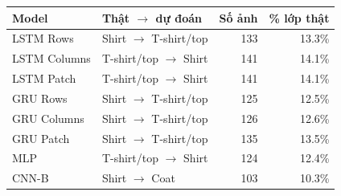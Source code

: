 \begin{tabular}{llrr}
\toprule
Model & Thật $\to$ dự đoán & Số ảnh & \% lớp thật\\
\midrule
LSTM Rows & Shirt $\to$ T-shirt/top & 133 & 13.3\%\\
LSTM Columns & T-shirt/top $\to$ Shirt & 141 & 14.1\%\\
LSTM Patch & T-shirt/top $\to$ Shirt & 141 & 14.1\%\\
GRU Rows & Shirt $\to$ T-shirt/top & 125 & 12.5\%\\
GRU Columns & Shirt $\to$ T-shirt/top & 126 & 12.6\%\\
GRU Patch & Shirt $\to$ T-shirt/top & 135 & 13.5\%\\
MLP & T-shirt/top $\to$ Shirt & 124 & 12.4\%\\
CNN-B & Shirt $\to$ Coat & 103 & 10.3\%\\
\bottomrule
\end{tabular}
